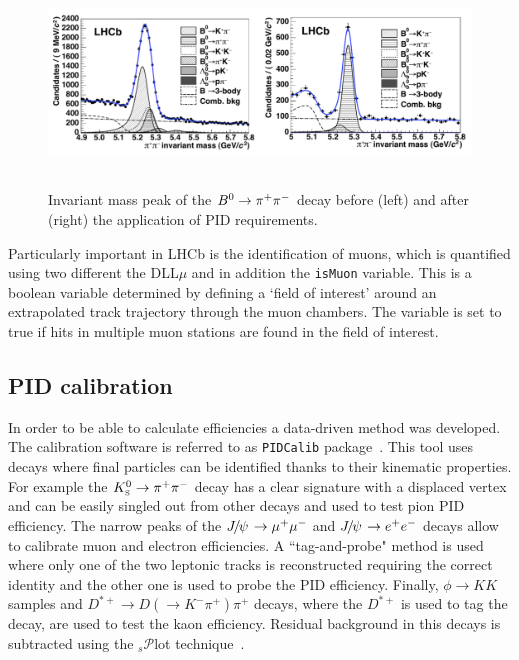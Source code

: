 \begin{figure}[h!]
\centering
\includegraphics[width=1.\textwidth,height=5.5cm]{Detector/figs/pid_peaks.png}
\caption{Invariant mass peak of the $\Bz\to\pi^+\pi^-$ decay before (left) and
after (right) the application of PID requirements. }
\label{fig:pid_peaks}
\end{figure}
%
Particularly important in LHCb is the identification of muons, which is quantified using two different the DLL$\mu$
and in addition the \verb!isMuon! variable. This is a boolean variable determined by defining a `field of interest' around 
an extrapolated track trajectory through the muon chambers. The variable is set to true if hits in multiple muon stations are found in the field of interest.

\subsection{PID calibration}
\label{sec:PID_calib}

In order to be able to calculate efficiencies a data-driven method was developed.
The calibration software is referred to as \verb!PIDCalib! package~\cite{Aaij:1978280}. 
This tool uses decays where final  particles can be identified thanks to their kinematic properties.
For example the $\KS\to\pi^+\pi^-$ decay has a clear signature with a displaced vertex
and can be easily singled out from other decays and used to test pion PID efficiency.
The narrow peaks of the $\jpsi\to\mumu$ and $\jpsi\to\ee$ decays allow to calibrate
muon and electron efficiencies. A ``tag-and-probe" method is used where only one 
of the two leptonic tracks is reconstructed requiring the correct identity and the other one
is used to probe the PID efficiency. Finally,  $\phi\to KK$ samples and 
$D^{*+}\to D(\to K^-\pi^+)\pi^+$ decays, where the $D^{*+}$ is used to tag the decay,
are used to test the kaon efficiency. Residual background in this decays is subtracted using
the $_s\mathcal{P}$lot technique~\cite{sPlot}.


